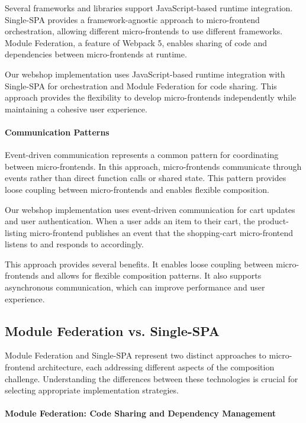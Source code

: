 \documentclass[12pt,a4paper]{report}
\begin{document}
Several frameworks and libraries support JavaScript-based runtime integration. Single-SPA provides a framework-agnostic approach to micro-frontend orchestration, allowing different micro-frontends to use different frameworks. Module Federation, a feature of Webpack 5, enables sharing of code and dependencies between micro-frontends at runtime.

Our webshop implementation uses JavaScript-based runtime integration with Single-SPA for orchestration and Module Federation for code sharing. This approach provides the flexibility to develop micro-frontends independently while maintaining a cohesive user experience.

\paragraph{Communication Patterns}

Event-driven communication represents a common pattern for coordinating between micro-frontends. In this approach, micro-frontends communicate through events rather than direct function calls or shared state. This pattern provides loose coupling between micro-frontends and enables flexible composition.

Our webshop implementation uses event-driven communication for cart updates and user authentication. When a user adds an item to their cart, the product-listing micro-frontend publishes an event that the shopping-cart micro-frontend listens to and responds to accordingly.

This approach provides several benefits. It enables loose coupling between micro-frontends and allows for flexible composition patterns. It also supports asynchronous communication, which can improve performance and user experience.

\subsection{Module Federation vs. Single-SPA}

Module Federation and Single-SPA represent two distinct approaches to micro-frontend architecture, each addressing different aspects of the composition challenge. Understanding the differences between these technologies is crucial for selecting appropriate implementation strategies.

\paragraph{Module Federation: Code Sharing and Dependency Management}
\end{document}
